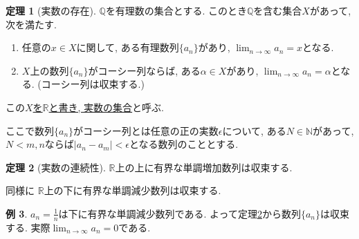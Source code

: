 \documentclass[dvipdfmx,a4paper,11pt]{article}
\newcommand{\R}{\mathbb{R}}
\newcommand{\Q}{\mathbb{Q}}
\newcommand{\N}{\mathbb{N}}
\theoremstyle{definition}
\newtheorem{thm}{定理}
\newtheorem{exa}[thm]{例}
\begin{document}
\begin{tcolorbox}[
    colback = white,
    colframe = green!35!black,
    fonttitle = \bfseries,
    breakable = true]
    \begin{thm}[実数の存在]
 $\Q$を有理数の集合とする.
このとき$\Q$を含む集合$X$があって, 次を満たす.
\begin{enumerate}
\item 任意の$x \in X$に関して, ある有理数列$\{ a_n\}$があり, $\lim_{n \rightarrow \infty} a_n = x$となる.
\item $X$上の数列$\{ a_n\}$がコーシー列ならば, ある$\alpha \in X$があり, $\lim_{n \rightarrow \infty} a_n = \alpha$となる. (コーシー列は収束する.)
\end{enumerate}

この\underline{$X$を$\R$と書き, 実数の集合}と呼ぶ.

\hspace{12pt}ここで数列$\{ a_n\}$がコーシー列とは任意の正の実数$\epsilon$について, ある$N \in \N$があって, $N < m,n$ならば$|a_n - a_m| < \epsilon$となる数列のこととする.


 \end{thm}
 \end{tcolorbox}
 
 \begin{tcolorbox}[
    colback = white,
    colframe = green!35!black,
    fonttitle = \bfseries,
    breakable = true]
    \begin{thm}[実数の連続性]
    \label{realconti}
$\R$上の上に有界な単調増加数列は収束する.

 \end{thm}
 \end{tcolorbox}
同様に $\R$上の下に有界な単調減少数列は収束する.
 
  \begin{exa}
$a_n = \frac{1}{n}$は下に有界な単調減少数列である. よって定理\ref{realconti}から数列$\{ a_n\}$は収束する.
実際$\lim_{n \rightarrow \infty} a_n =0$である. 
\end{exa}
\end{document}
